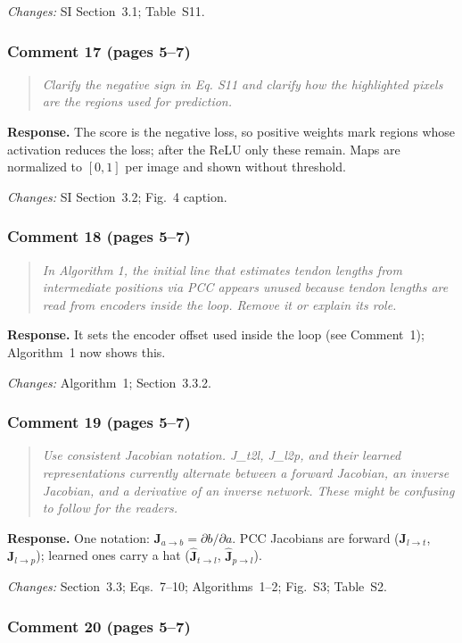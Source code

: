 \documentclass[11pt,a4paper]{article}
\newcommand{\rc}[1]{\begin{quote}\color{black!70}\itshape #1\end{quote}}
\begin{document}
\textit{Changes:} SI Section~3.1; Table~S11.

\subsubsection*{Comment 17 (pages 5--7)}

\rc{Clarify the negative sign in Eq. S11 and clarify how the highlighted pixels are the regions used for prediction.}
\textbf{Response.} The score is the negative loss, so positive weights mark regions whose activation reduces the loss; after the ReLU only these remain. Maps are normalized to $[0, 1]$ per image and shown without threshold.

\textit{Changes:} SI Section~3.2; Fig.~4 caption.

\subsubsection*{Comment 18 (pages 5--7)}

\rc{In Algorithm 1, the initial line that estimates tendon lengths from intermediate positions via PCC appears unused because tendon lengths are read from encoders inside the loop. Remove it or explain its role.}
\textbf{Response.} It sets the encoder offset used inside the loop (see Comment~1); Algorithm~1 now shows this.

\textit{Changes:} Algorithm~1; Section~3.3.2.

\subsubsection*{Comment 19 (pages 5--7)}

\rc{Use consistent Jacobian notation. J\_t2l, J\_l2p, and their learned representations currently alternate between a forward Jacobian, an inverse Jacobian, and a derivative of an inverse network. These might be confusing to follow for the readers.}
\textbf{Response.} One notation: $\mathbf{J}_{a \to b} = \partial b / \partial a$. PCC Jacobians are forward ($\mathbf{J}_{l \to t}$, $\mathbf{J}_{l \to p}$); learned ones carry a hat ($\hat{\mathbf{J}}_{t \to l}$, $\hat{\mathbf{J}}_{p \to l}$).

\textit{Changes:} Section~3.3; Eqs.~7--10; Algorithms~1--2; Fig.~S3; Table~S2.

\subsubsection*{Comment 20 (pages 5--7)}
\end{document}
